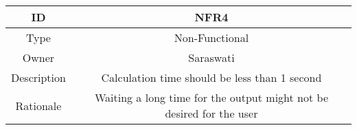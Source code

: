 \documentclass[a4paper,12pt]{article}
\begin{document}
        \begin{center}
        \begin{tabular}{||c c||} 
         \hline
         ID & NFR4 \\ 
         \hline
         Type & Non-Functional \\
         \hline
         Owner & Saraswati \\
         \hline
         Description & Calculation time should be less than 1 second \\
         \hline
         Rationale & Waiting a long time for the output might not be desired for the user \\
         \hline
        \end{tabular}
        \end{center}
    
\end{document}

